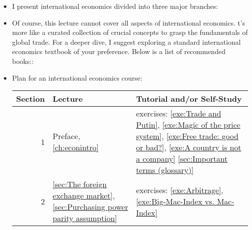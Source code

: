 \begin{itemize}
\item I present international economics divided into three major branches: 
	\item Of course, this lecture cannot cover all aspects of international economics. t's more like a curated collection of crucial concepts to grasp the fundamentals of global trade. For a deeper dive, I suggest exploring a standard international economics textbook of your preference. Below is a list of recommended books::
\nocite{Krugman2017International, Feenstra2017International,Pugel2015International, Robert2016International} \nocite{Marrewijk2012International,Marrewijk2017International}

\pbn
\item Plan for an international economics course:

	\begin{tabularx}{\textwidth}{r |@{\foo} lX}
		\toprule
		Section & Lecture & Tutorial and/or Self-Study\\\midrule
		1	& Preface, \autoref{ch:econintro}	& \pencil exercises: \ref{exe:Trade and Putin}, \ref{exe:Magic of the price system}, \ref{exe:Free trade: good or bad?}, \ref{exe:A country is not a company} \readsmall \autoref{sec:Important terms (glossary)}	\\
		2		& \autoref{sec:The foreign exchange market}, \autoref{sec:Purchasing power parity assumption}	
		& \pencil exercises: 	\autoref{exe:Arbitrage}, \autoref{exe:Big-Mac-Index vs. Mac-Index}\\
		

\end{tabularx}
\end{itemize}
